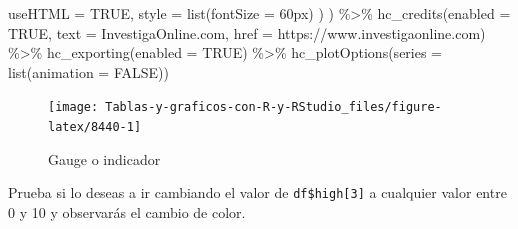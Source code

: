 \documentclass[
]{book}
\newenvironment{Shaded}{\begin{snugshade}}{\end{snugshade}}
\newcommand{\AttributeTok}[1]{\textcolor[rgb]{0.77,0.63,0.00}{#1}}
\newcommand{\ConstantTok}[1]{\textcolor[rgb]{0.00,0.00,0.00}{#1}}
\newcommand{\FunctionTok}[1]{\textcolor[rgb]{0.00,0.00,0.00}{#1}}
\newcommand{\NormalTok}[1]{#1}
\newcommand{\SpecialCharTok}[1]{\textcolor[rgb]{0.00,0.00,0.00}{#1}}
\newcommand{\StringTok}[1]{\textcolor[rgb]{0.31,0.60,0.02}{#1}}
\begin{document}
\begin{Shaded}
\begin{Highlighting}[]
               \AttributeTok{useHTML =} \ConstantTok{TRUE}\NormalTok{,}
               \AttributeTok{style =} \FunctionTok{list}\NormalTok{(}\AttributeTok{fontSize =} \StringTok{\textquotesingle{}60px\textquotesingle{}}\NormalTok{)}
\NormalTok{          )}
\NormalTok{     ) }\SpecialCharTok{\%\textgreater{}\%}
     \FunctionTok{hc\_credits}\NormalTok{(}\AttributeTok{enabled =} \ConstantTok{TRUE}\NormalTok{,}
                \AttributeTok{text =} \StringTok{\textquotesingle{}InvestigaOnline.com\textquotesingle{}}\NormalTok{,}
                \AttributeTok{href =} \StringTok{\textquotesingle{}https://www.investigaonline.com\textquotesingle{}}\NormalTok{) }\SpecialCharTok{\%\textgreater{}\%}
     \FunctionTok{hc\_exporting}\NormalTok{(}\AttributeTok{enabled =} \ConstantTok{TRUE}\NormalTok{) }\SpecialCharTok{\%\textgreater{}\%}
     \FunctionTok{hc\_plotOptions}\NormalTok{(}\AttributeTok{series =} \FunctionTok{list}\NormalTok{(}\AttributeTok{animation =} \ConstantTok{FALSE}\NormalTok{))}
\end{Highlighting}
\end{Shaded}

\begin{figure}[H]

{\centering \texttt{[image: Tablas-y-graficos-con-R-y-RStudio\_files/figure-latex/8440-1]} 

}

\caption{Gauge o indicador}\label{fig:8440}
\end{figure}

Prueba si lo deseas a ir cambiando el valor de \texttt{df\$high{[}3{]}} a cualquier valor entre 0 y 10 y observarás el cambio de color.
\end{document}
